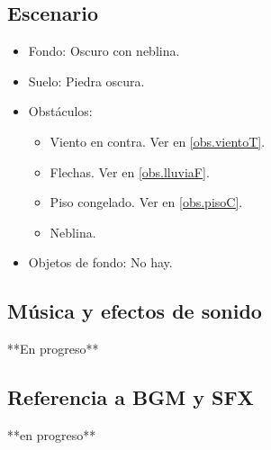 	\subsection{Escenario}
\begin{itemize} 
	\item Fondo: Oscuro con neblina.
	\item Suelo: Piedra oscura.
	\item Obstáculos:
	\begin{itemize}		
		\item Viento en contra. Ver en \ref{obs.vientoT}.
		\item Flechas. Ver en \ref{obs.lluviaF}.
		\item Piso congelado. Ver en \ref{obs.pisoC}.
		\item Neblina.
	\end{itemize}
	\item Objetos de fondo: No hay.
\end{itemize}	
	\subsection{Música y efectos de sonido}
	**En progreso**
	\subsection{Referencia a BGM y SFX}
	**en progreso**
